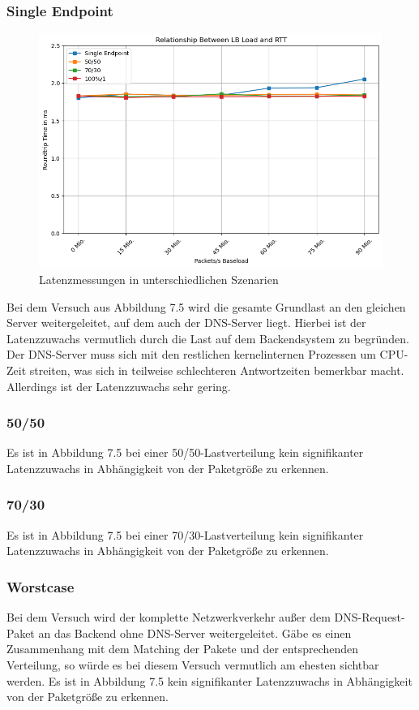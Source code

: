 \subsubsection{Single Endpoint}
\begin{figure}
    \centering
    \includegraphics[width=0.9\linewidth]{images/latency.png}
    \caption{Latenzmessungen in unterschiedlichen Szenarien}
    \label{fig:enter-label}
\end{figure}
Bei dem Versuch aus Abbildung 7.5 wird die gesamte Grundlast an den gleichen Server weitergeleitet, auf dem auch der DNS-Server liegt. Hierbei ist der Latenzzuwachs vermutlich durch die Last auf dem Backendsystem zu begründen. Der DNS-Server muss sich mit den restlichen kernelinternen Prozessen um CPU-Zeit streiten, was sich in teilweise schlechteren Antwortzeiten bemerkbar macht. Allerdings ist der Latenzzuwachs sehr gering.
\subsubsection{50/50}

Es ist in Abbildung 7.5 bei einer 50/50-Lastverteilung kein signifikanter Latenzzuwachs in Abhängigkeit von der Paketgröße zu erkennen.
\subsubsection{70/30}

Es ist in Abbildung 7.5 bei einer 70/30-Lastverteilung kein signifikanter Latenzzuwachs in Abhängigkeit von der Paketgröße zu erkennen.
\subsubsection{Worstcase}
Bei dem Versuch wird der komplette Netzwerkverkehr außer dem DNS-Request-Paket an das Backend ohne DNS-Server weitergeleitet. Gäbe es einen Zusammenhang mit dem Matching der Pakete und der entsprechenden Verteilung, so würde es bei diesem Versuch vermutlich am ehesten sichtbar werden.
Es ist in Abbildung 7.5 kein signifikanter Latenzzuwachs in Abhängigkeit von der Paketgröße zu erkennen.
